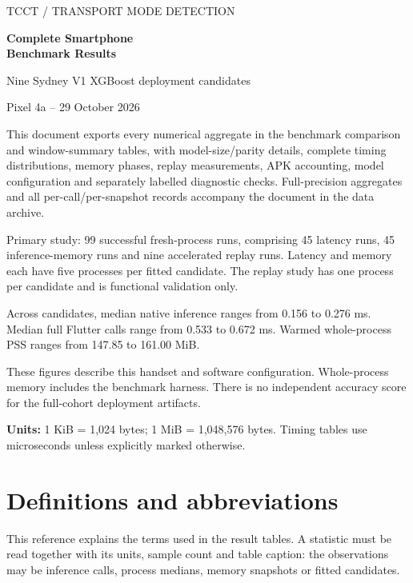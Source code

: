 \documentclass[10pt,a4paper]{article}
\begin{document}
\hypersetup{pageanchor=false}
\begin{titlepage}
\vspace*{20mm}
{\Large TCCT / TRANSPORT MODE DETECTION\par}
\vspace{9mm}
{\huge\bfseries Complete Smartphone\\Benchmark Results\par}
\vspace{6mm}
{\Large Nine Sydney V1 XGBoost deployment candidates\par}
\vspace{4mm}
{\large Pixel 4a -- 29 October 2026\par}
\vspace{12mm}

This document exports every numerical aggregate in the benchmark comparison and window-summary tables, with model-size/\allowbreak{}parity details, complete timing distributions, memory phases, replay measurements, APK accounting, model configuration and separately labelled diagnostic checks. Full-precision aggregates and all per-call/\allowbreak{}per-snapshot records accompany the document in the data archive.

Primary study:\allowbreak{} 99 successful fresh-process runs, comprising 45 latency runs, 45 inference-memory runs and nine accelerated replay runs. Latency and memory each have five processes per fitted candidate. The replay study has one process per candidate and is functional validation only.

Across candidates, median native inference ranges from 0.156 to 0.276 ms. Median full Flutter calls range from 0.533 to 0.672 ms. Warmed whole-process PSS ranges from 147.85 to 161.00 MiB.

These figures describe this handset and software configuration. Whole-process memory includes the benchmark harness. There is no independent accuracy score for the full-cohort deployment artifacts.

\vfill\textbf{Units:} 1 KiB = 1,024 bytes; 1 MiB = 1,048,576 bytes. Timing tables use microseconds unless explicitly marked otherwise.\end{titlepage}\hypersetup{pageanchor=true}
\tableofcontents\clearpage
\section{Definitions and abbreviations}
This reference explains the terms used in the result tables. A statistic must be read together with its units, sample count and table caption:\allowbreak{} the observations may be inference calls, process medians, memory snapshots or fitted candidates.
\end{document}
